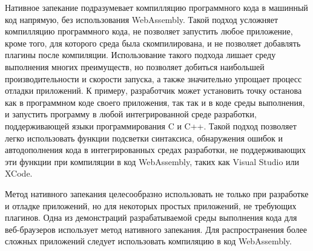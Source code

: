 Нативное запекание подразумевает компилляцию программного кода в машинный код напрямую, без использования WebAssembly.
Такой подход усложняет компилляцию программного кода, не позволяет запустить любое приложение, кроме того, для которого среда была скомпилирована, и не позволяет добавлять плагины после компиляции.
Использование такого подхода лишает среду выполнения многих преимуществ, но позволяет добиться наибольшей производительности и скорости запуска, а также значительно упрощает процесс отладки приложений.
К примеру, разработчик может установить точку останова как в программном коде своего приложения, так так и в коде среды выполнения, и запустить программу в любой интегрированной среде разработки, поддерживающей языки программирования C и C++.
Такой подход позволяет легко использовать функции подсветки синтаксиса, обнаружения ошибок и автодополнения кода в интегрированных средах разработки, не поддерживающих эти функции при компиляции в код WebAssembly, таких как Visual Studio или XCode.

Метод нативного запекания целесообразно использовать не только при разработке и отладке приложений, но для некоторых простых приложений, не требующих плагинов.
Одна из демонстраций разрабатываемой среды выполнения кода для веб-браузеров использует метод нативного запекания.
Для распространения более сложных приложений следует использовать компиляцию в код WebAssembly.